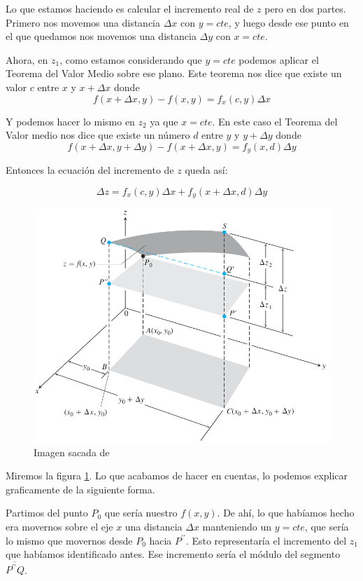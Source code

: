 \documentclass[12pt]{article}
\begin{document}
Lo que estamos haciendo es calcular el incremento real de $ z $ pero en dos partes. Primero nos movemos una distancia $ \Delta x $ con $ y = cte $, y luego desde ese punto en el que quedamos nos movemos una distancia $ \Delta y $ con $ x = cte $.

Ahora, en $ z_{1} $, como estamos considerando que $ y=cte $ podemos aplicar el Teorema del Valor Medio sobre ese plano. Este teorema nos dice que existe un valor $ c $ entre $ x $ y $ x + \Delta x $ donde
\[
	f(x + \Delta x, y) - f(x,y) = f_{x}(c,y)\Delta x
\]


Y podemos hacer lo mismo en $ z_{2} $ ya que $ x = cte $. En este caso el Teorema del Valor medio nos dice que existe un número $ d $ entre $ y $ y $ y + \Delta y $ donde
\[
	f(x + \Delta x, y + \Delta y) - f(x + \Delta x, y) = f_{y}(x,d)\Delta y
\]

Entonces la ecuación del incremento de $ z $ queda así: 

\[
	\Delta z = f_{x}(c, y)\Delta x + f_{y}(x + \Delta x, d)\Delta y
\]

\begin{figure}[H]
  \centering
  \includegraphics[width=0.7\linewidth]{imagenes/incremento_total.png}
  \caption{Imagen sacada de \parencite{thomas_calc_vv}}
  \label{fig:incremento_total}
\end{figure}

Miremos la figura \ref{fig:incremento_total}. Lo que acabamos de hacer en cuentas, lo podemos explicar graficamente de la siguiente forma. 

Partimos del punto $ P_{0} $ que sería nuestro $ f(x,y) $. De ahí, lo que habíamos hecho era movernos sobre el eje $ x $ una distancia $ \Delta x $ manteniendo un $ y = cte $, que sería lo mismo que movernos desde $ P_{0} $ hacia $ P^{\prime\prime} $. Esto representaría el incremento del $ z_{1} $ que habíamos identificado antes. Ese incremento sería el módulo del segmento $ \overline{P^{\prime\prime}Q} $.
\end{document}

